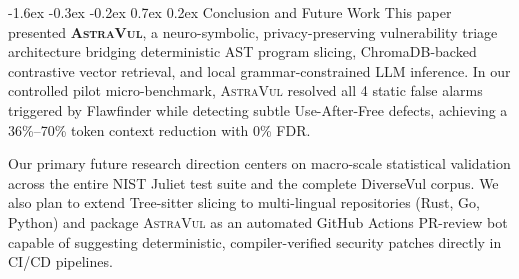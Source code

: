 \documentclass[10pt,twocolumn]{article}
\makeatletter
\renewcommand\section{\@startsection{section}{1}{\z@}%
  {-1.6ex \@plus -0.3ex \@minus -0.2ex}%
  {0.7ex \@plus 0.2ex}%
  {\normalfont\large\bfseries}}
\makeatother
\begin{document}
\section{Conclusion and Future Work}
This paper presented \textbf{\textsc{AstraVul}}, a neuro-symbolic, privacy-preserving vulnerability triage architecture bridging deterministic AST program slicing, ChromaDB-backed contrastive vector retrieval, and local grammar-constrained LLM inference. In our controlled pilot micro-benchmark, \textsc{AstraVul} resolved all 4 static false alarms triggered by Flawfinder while detecting subtle Use-After-Free defects, achieving a 36\%--70\% token context reduction with 0\% FDR.

Our primary future research direction centers on macro-scale statistical validation across the entire NIST Juliet test suite and the complete DiverseVul corpus. We also plan to extend Tree-sitter slicing to multi-lingual repositories (Rust, Go, Python) and package \textsc{AstraVul} as an automated GitHub Actions PR-review bot capable of suggesting deterministic, compiler-verified security patches directly in CI/CD pipelines.
\end{document}
